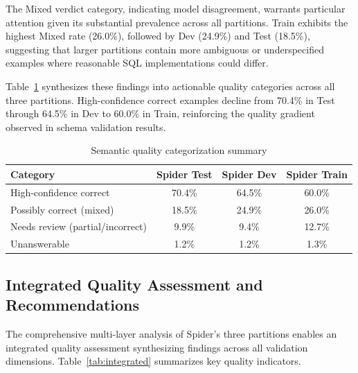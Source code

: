 \documentclass[]{einformatica}
\begin{document}
The Mixed verdict category, indicating model disagreement, warrants particular attention given its substantial prevalence across all partitions. Train exhibits the highest Mixed rate (26.0\%), followed by Dev (24.9\%) and Test (18.5\%), suggesting that larger partitions contain more ambiguous or underspecified examples where reasonable SQL implementations could differ.

Table~\ref{tab:semantic_categories} synthesizes these findings into actionable quality categories across all three partitions. High-confidence correct examples decline from 70.4\% in Test through 64.5\% in Dev to 60.0\% in Train, reinforcing the quality gradient observed in schema validation results.

\begin{table}[ht]
    \caption{Semantic quality categorization summary}
    \label{tab:semantic_categories}
    \centering
    \footnotesize
    \begin{tabular}{lccc}
        \toprule
        \textbf{Category} & \textbf{Spider Test} & \textbf{Spider Dev} & \textbf{Spider Train} \\
        \midrule
        High-confidence correct & 70.4\% & 64.5\% & 60.0\% \\
        Possibly correct (mixed) & 18.5\% & 24.9\% & 26.0\% \\
        Needs review (partial/incorrect) & 9.9\% & 9.4\% & 12.7\% \\
        Unanswerable & 1.2\% & 1.2\% & 1.3\% \\
        \bottomrule
    \end{tabular}
\end{table}

\subsection{Integrated Quality Assessment and Recommendations}

The comprehensive multi-layer analysis of Spider's three partitions enables an integrated quality assessment synthesizing findings across all validation dimensions. Table~\ref{tab:integrated} summarizes key quality indicators.
\end{document}
